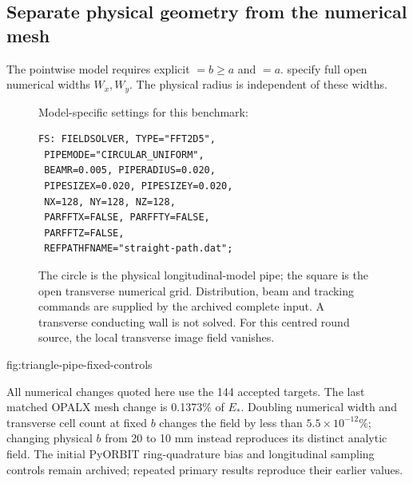 \clearpage
\subsection{Separate physical geometry from the numerical mesh}
The pointwise model requires explicit $=b\ge a$ and
$=a$.  specify full open numerical widths
$W_x,W_y$. The physical radius is independent of these widths.
\begin{figure}[H]
\centering
\begin{minipage}[c]{0.53\linewidth}
\small
Model-specific settings for this benchmark:
\begin{verbatim}
FS: FIELDSOLVER, TYPE="FFT2D5",
 PIPEMODE="CIRCULAR_UNIFORM",
 BEAMR=0.005, PIPERADIUS=0.020,
 PIPESIZEX=0.020, PIPESIZEY=0.020,
 NX=128, NY=128, NZ=128,
 PARFFTX=FALSE, PARFFTY=FALSE,
 PARFFTZ=FALSE,
 REFPATHFNAME="straight-path.dat";
\end{verbatim}
\end{minipage}\hfill
\begin{minipage}[c]{0.44\linewidth}
\centering
\end{minipage}
\caption{The circle is the physical longitudinal-model pipe; the square is
the open transverse numerical grid. Distribution, beam and tracking commands
are supplied by the archived complete input. A transverse conducting wall
is not solved. For this centred round source, the local transverse image
field vanishes.}
\label{fig:pipe-model-geometry}
\end{figure}
{fig:triangle-pipe-fixed-controls}

All numerical changes quoted here use the 144 accepted targets. The last
matched OPALX mesh change is 0.1373\% of $E_*$. Doubling numerical width
and transverse cell count at fixed $b$ changes the field by less than
$5.5\times10^{-12}\%$; changing physical $b$ from 20 to 10 mm instead
reproduces its distinct analytic field. The initial PyORBIT ring-quadrature
bias and longitudinal sampling controls remain archived; repeated primary
results reproduce their earlier values.

